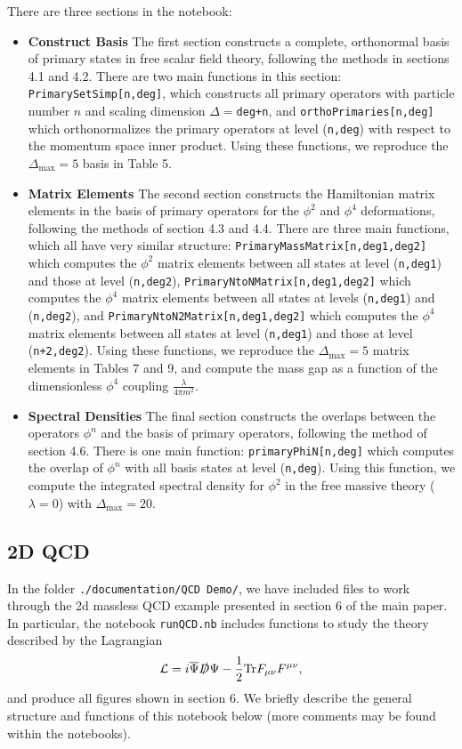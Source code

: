 \documentclass[12pt]{article}
\newcommand{\Lcal}{{\mathcal L}}
\newcommand\De\Delta
\newcommand{\fr}{\frac}
\newcommand{\Dmax}{\De_{\max}}
\newcommand{\Tr}{\textrm{Tr}}
\newcommand{\Psibar}{\overline{\Psi}}
\begin{document}
There are three sections in the notebook:
\begin{itemize}
\item \textbf{Construct Basis}\newline
The first section constructs a complete, orthonormal basis of primary states in free scalar field theory, following the methods in sections 4.1 and 4.2. There are two main functions in this section: {\tt PrimarySetSimp[n,deg]}, which constructs all primary operators with particle number $n$ and scaling dimension $\De=${\tt deg+n}, and {\tt orthoPrimaries[n,deg]} which orthonormalizes the primary operators at level ({\tt n,deg}) with respect to the momentum space inner product. Using these functions, we reproduce the $\Dmax=5$ basis in Table 5.
\item \textbf{Matrix Elements} \newline
The second section constructs the Hamiltonian matrix elements in the basis of primary operators for the $\phi^2$ and $\phi^4$ deformations, following the methods of section 4.3 and 4.4. There are three main functions, which all have very similar structure: {\tt PrimaryMassMatrix[n,deg1,deg2]} which computes the $\phi^2$ matrix elements between all states at level ({\tt n,deg1}) and those at level ({\tt n,deg2}), {\tt PrimaryNtoNMatrix[n,deg1,deg2]} which computes the $\phi^4$ matrix elements between all states at levels ({\tt n,deg1}) and ({\tt n,deg2}), and {\tt PrimaryNtoN2Matrix[n,deg1,deg2]} which computes the $\phi^4$ matrix elements between all states at level ({\tt n,deg1}) and those at level ({\tt n+2,deg2}). Using these functions, we reproduce the $\Dmax=5$ matrix elements in Tables 7 and 9, and compute the mass gap as a function of the dimensionless $\phi^4$ coupling $\fr{\lambda}{4\pi m^2}$.
\item \textbf{Spectral Densities} \newline
The final section constructs the overlaps between the operators $\phi^n$ and the basis of primary operators, following the method of section 4.6. There is one main function: {\tt primaryPhiN[n,deg]} which computes the overlap of $\phi^n$ with all basis states at level ({\tt n,deg}). Using this function, we compute the integrated spectral density for $\phi^2$ in the free massive theory ($\lambda=0$) with $\Dmax=20$.
\end{itemize}

\subsection{2D QCD}
\label{sec:2dQCD}
 In the folder {\tt ./documentation/QCD Demo/}, we have included files to work through the 2d massless QCD example presented in section 6 of the main paper. In particular, the notebook {\tt runQCD.nb} includes functions to study the theory described by the Lagrangian \begin{equation}
  \Lcal= i \Psibar \slashed{D} \Psi - \frac{1}{2}\Tr F_{\mu\nu}F^{\mu\nu},
\end{equation} and produce all figures shown in section 6. We briefly describe the general structure and functions of this notebook below (more comments may be found within the notebooks).
\end{document}

